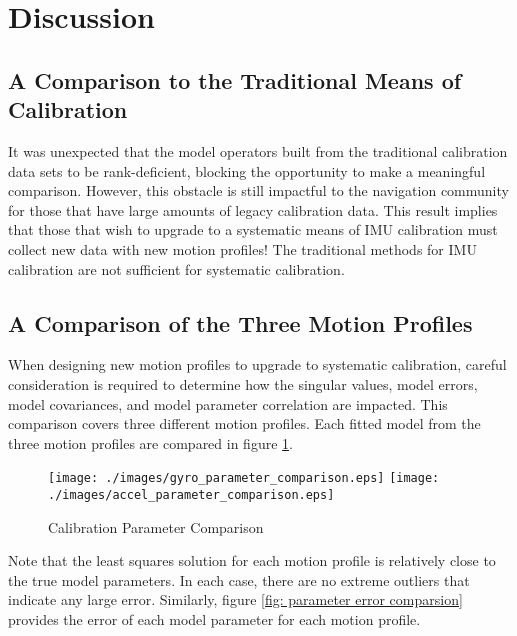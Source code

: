 
\begingroup
\allowdisplaybreaks

\section{Discussion}

\subsection{A Comparison to the Traditional Means of Calibration}

It was unexpected that the model operators built from the traditional calibration data sets to be rank-deficient, blocking the opportunity to make a meaningful comparison. However, this obstacle is still impactful to the navigation community for those that have large amounts of legacy calibration data. This result implies that those that wish to upgrade to a systematic means of IMU calibration must collect new data with new motion profiles! The traditional methods for IMU calibration are not sufficient for systematic calibration.

\subsection{A Comparison of the Three Motion Profiles}

When designing new motion profiles to upgrade to systematic calibration, careful consideration is required to determine how the singular values, model errors, model covariances, and model parameter correlation are impacted. This comparison covers three different motion profiles. Each fitted model from the three motion profiles are compared in figure \ref{fig: parameter comparsion}.

\begin{figure}[!h] 
	\centering
	\texttt{[image: ./images/gyro\_parameter\_comparison.eps]} \hfill
	\texttt{[image: ./images/accel\_parameter\_comparison.eps]}
	\caption{Calibration Parameter Comparison}
	\label{fig: parameter comparsion}
\end{figure}
\FloatBarrier

Note that the least squares solution for each motion profile is relatively close to the true model parameters. In each case, there are no extreme outliers that indicate any large error. Similarly, figure \ref{fig: parameter error comparsion} provides the error of each model parameter for each motion profile. 

